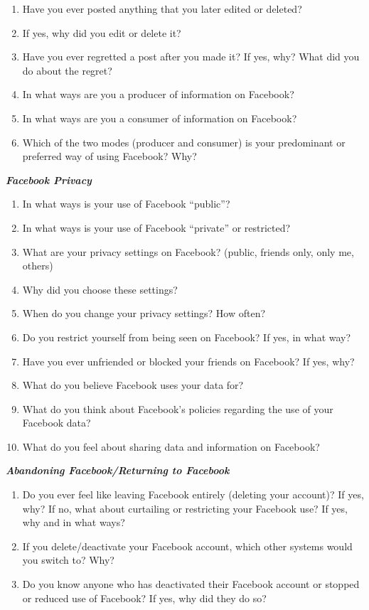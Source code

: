 \begin{appendices}
\begin{enumerate}
\item Have you ever posted anything that you later edited or deleted?
\item If yes, why did you edit or delete it?
\item Have you ever regretted a post after you made it? If yes, why? What did you do about the regret?
\item In what ways are you a producer of information on Facebook?
\item In what ways are you a consumer of information on Facebook?
\item Which of the two modes (producer and consumer) is your predominant or preferred way of using Facebook? Why? 
\end{enumerate}
\textbf{\textit{Facebook Privacy}}
\begin{enumerate}
\item In what ways is your use of Facebook “public”?
\item In what ways is your use of Facebook “private” or restricted?
\item What are your privacy settings on Facebook? (public, friends only, only me, others)
\item Why did you choose these settings?
\item When do you change your privacy settings? How often?
\item Do you restrict yourself from being seen on Facebook? If yes, in what way?
\item Have you ever unfriended or blocked your friends on Facebook? If yes, why?
\item What do you believe Facebook uses your data for?
\item What do you think about Facebook’s policies regarding the use of your Facebook data?
\item What do you feel about sharing data and information on Facebook?
\end{enumerate}
\textbf{\textit{Abandoning Facebook/Returning to Facebook}}
\begin{enumerate}
\item Do you ever feel like leaving Facebook entirely (deleting your account)? If yes, why? If no, what about curtailing or restricting your Facebook use? If yes, why and in what ways?
\item If you delete/deactivate your Facebook account, which other systems would you switch to? Why?
\item Do you know anyone who has deactivated their Facebook account or stopped or reduced use of Facebook? If yes, why did they do so?

\end{enumerate}
\end{appendices}
